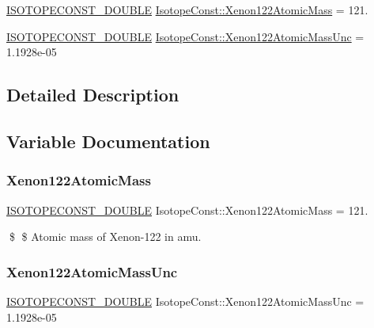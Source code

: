 \begin{DoxyCompactItemize}
\item 
\mbox{\hyperlink{group___isotope_const-_macros_ga8f45a7272ce02c0b4c65c44636ed719a}{I\+S\+O\+T\+O\+P\+E\+C\+O\+N\+S\+T\+\_\+\+D\+O\+U\+B\+LE}} \mbox{\hyperlink{group___isotope_const-_xenon-_xe122_ga3ab43b3cc243463b60544d5c583f9cbf}{Isotope\+Const\+::\+Xenon122\+Atomic\+Mass}} = 121.
\item 
\mbox{\hyperlink{group___isotope_const-_macros_ga8f45a7272ce02c0b4c65c44636ed719a}{I\+S\+O\+T\+O\+P\+E\+C\+O\+N\+S\+T\+\_\+\+D\+O\+U\+B\+LE}} \mbox{\hyperlink{group___isotope_const-_xenon-_xe122_ga815e57888321c790ee10ec695a94ea9e}{Isotope\+Const\+::\+Xenon122\+Atomic\+Mass\+Unc}} = 1.\+1928e-\/05
\end{DoxyCompactItemize}


\subsection{Detailed Description}


\subsection{Variable Documentation}
\mbox{\label{group___isotope_const-_xenon-_xe122_ga3ab43b3cc243463b60544d5c583f9cbf}} 
\subsubsection{\texorpdfstring{Xenon122\+Atomic\+Mass}{Xenon122AtomicMass}}
{\footnotesize\ttfamily \mbox{\hyperlink{group___isotope_const-_macros_ga8f45a7272ce02c0b4c65c44636ed719a}{I\+S\+O\+T\+O\+P\+E\+C\+O\+N\+S\+T\+\_\+\+D\+O\+U\+B\+LE}} Isotope\+Const\+::\+Xenon122\+Atomic\+Mass = 121.}

\$ \$ Atomic mass of Xenon-\/122 in amu. \mbox{\label{group___isotope_const-_xenon-_xe122_ga815e57888321c790ee10ec695a94ea9e}} 
\subsubsection{\texorpdfstring{Xenon122\+Atomic\+Mass\+Unc}{Xenon122AtomicMassUnc}}
{\footnotesize\ttfamily \mbox{\hyperlink{group___isotope_const-_macros_ga8f45a7272ce02c0b4c65c44636ed719a}{I\+S\+O\+T\+O\+P\+E\+C\+O\+N\+S\+T\+\_\+\+D\+O\+U\+B\+LE}} Isotope\+Const\+::\+Xenon122\+Atomic\+Mass\+Unc = 1.\+1928e-\/05}

